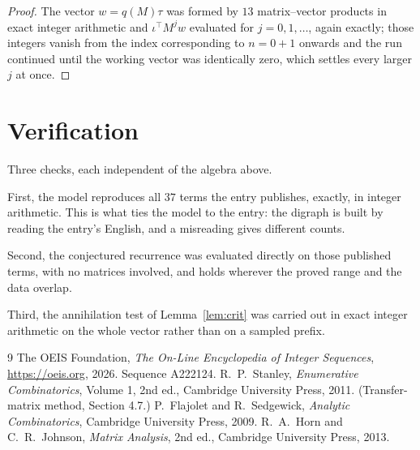 \documentclass[11pt,a4paper]{article}
\theoremstyle{plain}
\theoremstyle{definition}
\begin{document}
\begin{proof}
The vector $w=q(M)\tau$ was formed by $13$ matrix--vector products in exact integer
arithmetic and $\iota^{\!\top}M^{j}w$ evaluated for $j=0,1,\dots$, again exactly; those
integers vanish from the index corresponding to $n=0+1$ onwards and the run continued
until the working vector was identically zero, which settles every larger $j$ at once.
\end{proof}

\section{Verification}

Three checks, each independent of the algebra above.

First, the model reproduces all $37$ terms the entry publishes, exactly, in integer
arithmetic. This is what ties the model to the entry: the digraph is built by reading the
entry's English, and a misreading gives different counts.

Second, the conjectured recurrence was evaluated directly on those published terms, with no
matrices involved, and holds wherever the proved range and the data overlap.

Third, the annihilation test of Lemma~\ref{lem:crit} was carried out in exact integer
arithmetic on the whole vector rather than on a sampled prefix.

\begin{thebibliography}{9}
 The OEIS Foundation, \emph{The On-Line Encyclopedia of Integer
Sequences}, \url{https://oeis.org}, 2026. Sequence A222124.
 R.~P.~Stanley, \emph{Enumerative Combinatorics}, Volume 1, 2nd ed.,
Cambridge University Press, 2011. (Transfer-matrix method, Section 4.7.)
 P.~Flajolet and R.~Sedgewick, \emph{Analytic Combinatorics}, Cambridge
University Press, 2009.
 R.~A.~Horn and C.~R.~Johnson, \emph{Matrix Analysis}, 2nd ed., Cambridge
University Press, 2013.
\end{thebibliography}
\end{document}
